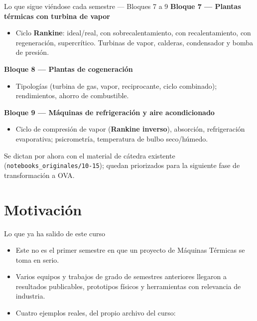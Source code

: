 \documentclass[aspectratio=169]{beamer}
\begin{document}
\begin{frame}{Lo que sigue viéndose cada semestre — Bloques 7 a 9}
  \small
  \textbf{Bloque 7 — Plantas térmicas con turbina de vapor}
  \begin{itemize}
    \item Ciclo \textbf{Rankine}: ideal/real, con sobrecalentamiento, con recalentamiento, con
      regeneración, supercrítico. Turbinas de vapor, calderas, condensador y bomba de presión.
  \end{itemize}
  \textbf{Bloque 8 — Plantas de cogeneración}
  \begin{itemize}
    \item Tipologías (turbina de gas, vapor, reciprocante, ciclo combinado); rendimientos, ahorro de
      combustible.
  \end{itemize}
  \textbf{Bloque 9 — Máquinas de refrigeración y aire acondicionado}
  \begin{itemize}
    \item Ciclo de compresión de vapor (\textbf{Rankine inverso}), absorción, refrigeración evaporativa;
      psicrometría, temperatura de bulbo seco/húmedo.
  \end{itemize}
  \vspace{0.2cm}
  \footnotesize Se dictan por ahora con el material de cátedra existente (\texttt{notebooks\_originales/10-15});
  quedan priorizados para la siguiente fase de transformación a OVA.
\end{frame}

\section{Motivación}
\begin{frame}{Lo que ya ha salido de este curso}
  \begin{itemize}
    \item Este no es el primer semestre en que un proyecto de Máquinas Térmicas se toma en serio.
    \item Varios equipos y trabajos de grado de semestres anteriores llegaron a resultados publicables,
      prototipos físicos y herramientas con relevancia de industria.
    \item Cuatro ejemplos reales, del propio archivo del curso:
  \end{itemize}
\end{frame}
\end{document}
